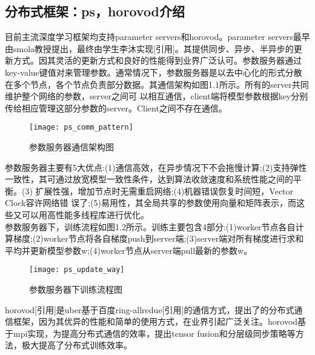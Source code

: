 \subsection{分布式框架：ps，horovod介绍}
目前主流深度学习框架均支持parameter servers和horovod。parameter servers最早由smola教授提出，最终由学生李沐实现[引用]。其提供同步、异步、半异步的更新方式。因其灵活的更新方式和良好的性能得到业界广泛认可。参数服务器通过key-value键值对来管理参数。通常情况下，参数服务器是以去中心化的形式分散在多个节点，各个节点负责部分数据。其通信架构如图1.1所示。所有的server共同维护整个网络的参数，server之间可 以相互通信，client端将模型参数根据key分别传给相应管理这部分参数的server。Client之间不存在通信。\\
\begin{figure}[htp]
\centering
\texttt{[image: ps\_comm\_pattern]}
\caption{参数服务器通信架构图}
\end{figure}
参数服务器主要有5大优点:(1)通信高效，在异步情况下不会拖慢计算;(2)支持弹性一致性，其可通过放宽模型一致性条件，达到算法收敛速度和系统性能之间的平衡。(3) 扩展性强，增加节点时无需重启网络;(4)机器错误恢复时间短，Vector Clock容许网络错 误了;(5)易用性，其全局共享的参数使用向量和矩阵表示，而这些又可以用高性能多线程库进行优化。\\
参数服务器下，训练流程如图1.2所示。训练主要包含4部分:(1)worker节点各自计算梯度;(2)worker节点将各自梯度push到server端;(3)server端对所有梯度进行求和平均并更新模型参数w;(4)worker节点从server端pull最新的参数w。\\
\begin{figure}[htp]
\centering
\texttt{[image: ps\_update\_way]}
\caption{参数服务器下训练流程图}
\end{figure}
horovod[引用]是uber基于百度ring-allredue[引用]的通信方式，提出了的分布式通信框架，因为其优异的性能和简单的使用方式，在业界引起广泛关注。horovod基于mpi实现，为提高分布式通信的效率，提出tensor fusion和分层级同步策略等方法，极大提高了分布式训练效率。

